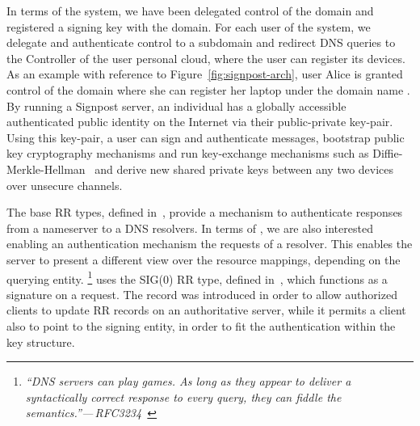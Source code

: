 In terms of the \signpost system, we have been delegated control of the \fqsn{ }
domain and registered a signing key with the  domain.  For each user
of the \signpost system, we delegate and authenticate control to a subdomain and
redirect DNS queries to the \signpost Controller of the user personal cloud,
where the user can register its devices. As an example with reference to
Figure~\ref{fig:signpost-arch}, user Alice is granted control of the domain
 where she can register her laptop under the domain name
.  By running a Signpost server, an individual has a globally
accessible authenticated public identity on the Internet via their
public-private key-pair. Using this key-pair, a user can sign and authenticate
messages, bootstrap public key cryptography mechanisms and run key-exchange
mechanisms such as Diffie-Merkle-Hellman~\cite{RFC2631} and derive new
shared private keys between any two devices over unsecure channels.

The base \dnssec RR types, defined in~\cite{RFC4034}, provide a mechanism to
authenticate responses from a nameserver to a DNS resolvers. In terms of
\signpost, we are also interested enabling an authentication mechanism the
requests of a resolver. This enables the server to present a different view
over the resource mappings, depending on the querying entity.  \footnote{{\em
    ``DNS servers can play games. As long as they appear to deliver a
    syntactically correct response to every query, they can fiddle the
    semantics.''---\,RFC3234~\cite{RFC3234}}} \signpost uses the SIG(0) RR type,
defined in~\cite{RFC2931}, which functions as a signature on a request. The
record was introduced in order to allow authorized clients to update RR records
on an authoritative server, while it permits a client also to point to the
signing entity, in order to fit the authentication within the \dnssec key structure. 


